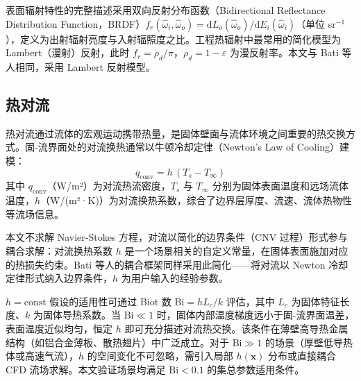 表面辐射特性的完整描述采用双向反射分布函数（Bidirectional Reflectance Distribution Function，BRDF）$f_r(\hat\omega_i, \hat\omega_o) = \mathrm{d}L_o(\hat\omega_o) / \mathrm{d}E_i(\hat\omega_i)$（单位 sr$^{-1}$），定义为出射辐射亮度与入射辐照度之比\cite{modestRadiativeHeatTransfer2013,howellThermalRadiationHeat2021}。工程热辐射中最常用的简化模型为Lambert（漫射）反射，此时 $f_r = \rho_d / \pi$，$\rho_d = 1 - \varepsilon$ 为漫反射率。本文与 Bati 等人\cite{batiCouplingConductionConvection2023}相同，采用 Lambert 反射模型。

\subsection{热对流}

热对流通过流体的宏观运动携带热量，是固体壁面与流体环境之间重要的热交换方式。固-流界面处的对流换热通常以牛顿冷却定律（Newton's Law of Cooling）建模：
\begin{equation}
    q_\mathrm{conv} = h\,(T_s - T_\infty)
\end{equation}
其中 $q_\mathrm{conv}$（W/m²）为对流热流密度，$T_s$ 与 $T_\infty$ 分别为固体表面温度和远场流体温度，$h$（W/(m²·K)）为对流换热系数，综合了边界层厚度、流速、流体热物性等流场信息。

本文不求解 Navier-Stokes 方程，对流以简化的边界条件（CNV 过程）形式参与耦合求解：对流换热系数 $h$ 是一个场景相关的自定义常量，在固体表面施加对应的热损失约束\cite{bergmanFundamentalsHeatMass2011}。Bati 等人\cite{batiCouplingConductionConvection2023}的耦合框架同样采用此简化——将对流以 Newton 冷却定律形式纳入边界条件，$h$ 为用户输入的经验参数。

$h = \text{const}$ 假设的适用性可通过 Biot 数 $\text{Bi} = hL_c/k$ 评估，其中 $L_c$ 为固体特征长度、$k$ 为固体导热系数。当 $\text{Bi} \ll 1$ 时，固体内部温度梯度远小于固-流界面温差，表面温度近似均匀，恒定 $h$ 即可充分描述对流热交换\cite{bergmanFundamentalsHeatMass2011}。该条件在薄壁高导热金属结构（如铝合金薄板、散热翅片）中广泛成立。对于 $\text{Bi} \gg 1$ 的场景（厚壁低导热体或高速气流），$h$ 的空间变化不可忽略，需引入局部 $h(\mathbf{x})$ 分布或直接耦合 CFD 流场求解。本文验证场景均满足 $\text{Bi} < 0.1$ 的集总参数适用条件。

